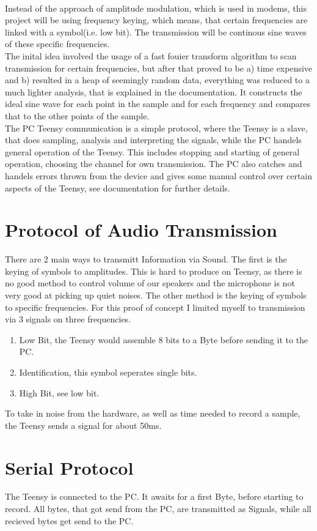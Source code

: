 \documentclass{book}
\begin{document}
\\Instead of the approach of amplitude modulation, which is used in modems, this project will be using frequency keying, which means, that certain frequencies are linked with a symbol(i.e. low bit). The transmission will be continous sine waves of these specific frequencies.
\\The inital idea involved the usage of a fast fouier transform algorithm to scan transmission for certain frequencies, but after that proved to be a) time expensive and b) resulted in a heap of seemingly random data, everything was reduced to a much lighter analysis, that is explained in the documentation. It constructs the ideal sine wave for each point in the sample and for each frequency and compares that to the other points of the sample. 
\\The PC Teensy communication is a simple protocol, where the Teensy is a slave, that does sampling, analysis and interpreting the signals, while the PC handels general operation of the Teensy. This includes stopping and starting of general operation, choosing the channel for own transmission. The PC also catches and handels errors thrown from the device and gives some manual control over certain aspects of the Teensy, see documentation for further details. 

\chapter{Protocol of Audio Transmission}
There are 2 main ways to transmitt Information via Sound. The first is the keying of symbols to amplitudes. This is hard to produce on Teensy, as there is no good method to control volume of our speakers and the microphone is not very good at picking up quiet noises. The other method is the keying of symbols to specific frequencies. For this proof of concept I limited myself to transmission via 3 signals on three frequencies.
\begin{enumerate}
\item Low Bit, the Teensy would assemble 8 bits to a Byte before sending it to the PC.
\item Identification, this symbol seperates single bits.
\item High Bit, see low bit.
\end{enumerate}
To take in noise from the hardware, as well as time needed to record a sample, the Teensy sends a signal for about 50ms.

\chapter{Serial Protocol}
The Teensy is connected to the PC. It awaits for a first Byte, before starting to record. All bytes, that got send from the PC, are transmitted as Signals, while all recieved bytes get send to the PC.
\end{document}
